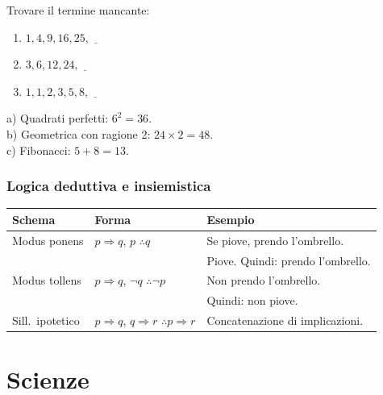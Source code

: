 \documentclass[12pt, a4paper, twoside, openright]{book}
\theoremstyle{definition}
\begin{document}
\begin{esercizio}
Trovare il termine mancante:
\begin{enumerate}[label=\alph*)]
  \item $1, 4, 9, 16, 25, \underline{\hspace{1em}}$
  \item $3, 6, 12, 24, \underline{\hspace{1em}}$
  \item $1, 1, 2, 3, 5, 8, \underline{\hspace{1em}}$
\end{enumerate}
\end{esercizio}
\begin{soluzione}
a) Quadrati perfetti: $6^2 = 36$.\\
b) Geometrica con ragione 2: $24 \times 2 = 48$.\\
c) Fibonacci: $5 + 8 = 13$.
\end{soluzione}

\section{Logica deduttiva e insiemistica}

\begin{defbox}
\begin{center}
\renewcommand{\arraystretch}{1.2}
\begin{tabular}{lll}
\toprule
\textbf{Schema} & \textbf{Forma} & \textbf{Esempio} \\
\midrule
Modus ponens & $p \Rightarrow q$,\; $p$ \; $\therefore q$ & Se piove, prendo l'ombrello.\\
& & Piove. Quindi: prendo l'ombrello. \\
\midrule
Modus tollens & $p \Rightarrow q$,\; $\neg q$ \; $\therefore \neg p$ & Non prendo l'ombrello.\\
& & Quindi: non piove. \\
\midrule
Sill.\ ipotetico & $p \Rightarrow q$,\; $q \Rightarrow r$ \; $\therefore p \Rightarrow r$ & Concatenazione di implicazioni. \\
\bottomrule
\end{tabular}
\end{center}
\end{defbox}

\part{Scienze}
\end{document}
